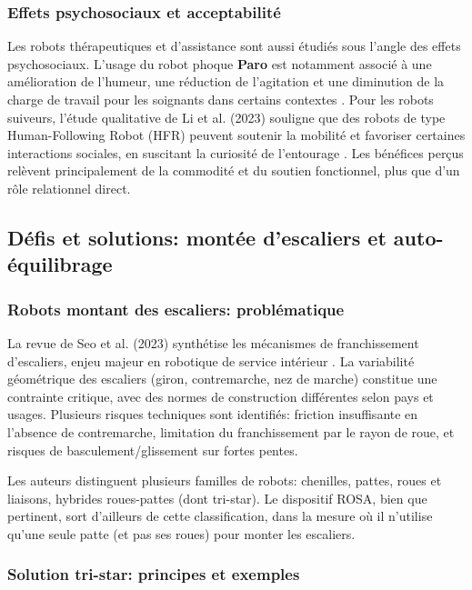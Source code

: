 \documentclass[12pt,a4paper]{article}
\begin{document}
\subsubsection*{Effets psychosociaux et acceptabilité}

Les robots thérapeutiques et d’assistance sont aussi étudiés sous l’angle des effets psychosociaux. L’usage du robot phoque \textbf{Paro} est notamment associé à une amélioration de l’humeur, une réduction de l’agitation et une diminution de la charge de travail pour les soignants dans certains contextes \cite{shibata2011}. Pour les robots suiveurs, l’étude qualitative de Li et al. (2023) souligne que des robots de type Human-Following Robot (HFR) peuvent soutenir la mobilité et favoriser certaines interactions sociales, en suscitant la curiosité de l’entourage \cite{li2023}. Les bénéfices perçus relèvent principalement de la commodité et du soutien fonctionnel, plus que d’un rôle relationnel direct.

\subsection{Défis et solutions: montée d’escaliers et auto-équilibrage}

\subsubsection*{Robots montant des escaliers: problématique}

La revue de Seo et al. (2023) synthétise les mécanismes de franchissement d’escaliers, enjeu majeur en robotique de service intérieur \cite{seo2023}. La variabilité géométrique des escaliers (giron, contremarche, nez de marche) constitue une contrainte critique, avec des normes de construction différentes selon pays et usages. Plusieurs risques techniques sont identifiés: friction insuffisante en l’absence de contremarche, limitation du franchissement par le rayon de roue, et risques de basculement/glissement sur fortes pentes.

Les auteurs distinguent plusieurs familles de robots: chenilles, pattes, roues et liaisons, hybrides roues-pattes (dont tri-star). Le dispositif ROSA, bien que pertinent, sort d’ailleurs de cette classification, dans la mesure où il n’utilise qu’une seule patte (et pas ses roues) pour monter les escaliers.

\subsubsection*{Solution tri-star: principes et exemples}
\end{document}
